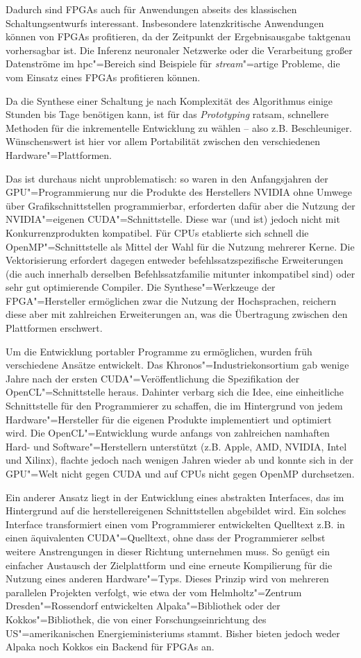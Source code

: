 Dadurch sind FPGAs auch für Anwendungen abseits des klassischen
Schaltungsentwurfs interessant. Insbesondere latenzkritische Anwendungen können
von FPGAs profitieren, da der Zeitpunkt der Ergebnisausgabe taktgenau
vorhersagbar ist. Die Inferenz neuronaler Netzwerke oder die Verarbeitung großer
Datenströme im \gls{hpc}"=Bereich sind Beispiele für \textit{stream}"=artige
Probleme, die vom Einsatz eines FPGAs profitieren können.

Da die Synthese einer Schaltung je nach Komplexität des Algorithmus einige
Stunden bis Tage benötigen kann, ist für das \textit{Prototyping} ratsam,
schnellere Methoden für die inkrementelle Entwicklung zu wählen -- also z.B.
Beschleuniger. Wünschenswert ist hier vor allem Portabilität zwischen den
verschiedenen Hardware"=Plattformen.

Das ist durchaus nicht unproblematisch: so waren in den Anfangsjahren der
GPU"=Programmierung nur die Produkte des Herstellers NVIDIA ohne Umwege über
Grafikschnittstellen programmierbar, erforderten dafür aber die Nutzung der
NVIDIA"=eigenen CUDA"=Schnittstelle. Diese war (und ist) jedoch nicht mit
Konkurrenzprodukten kompatibel. Für CPUs etablierte sich schnell die
OpenMP"=Schnittstelle als Mittel der Wahl für die Nutzung mehrerer Kerne.
Die Vektorisierung erfordert dagegen entweder befehlssatzspezifische
Erweiterungen (die auch innerhalb derselben Befehlssatzfamilie mitunter
inkompatibel sind) oder sehr gut optimierende Compiler. Die Synthese"=Werkzeuge
der FPGA"=Hersteller ermöglichen zwar die Nutzung der Hochsprachen, reichern
diese aber mit zahlreichen Erweiterungen an, was die Übertragung zwischen den
Plattformen erschwert.

Um die Entwicklung portabler Programme zu ermöglichen, wurden früh verschiedene
Ansätze entwickelt. Das Khronos"=Industriekonsortium gab wenige Jahre nach der
ersten CUDA"=Veröffentlichung die Spezifikation der OpenCL"=Schnittstelle
heraus. Dahinter verbarg sich die Idee, eine einheitliche Schnittstelle für den
Programmierer zu schaffen, die im Hintergrund von jedem Hardware"=Hersteller für
die eigenen Produkte implementiert und optimiert wird. Die OpenCL"=Entwicklung
wurde anfangs von zahlreichen namhaften Hard- und Software"=Herstellern
unterstützt (z.B. Apple, AMD, NVIDIA, Intel und Xilinx), flachte jedoch nach
wenigen Jahren wieder ab und konnte sich in der GPU"=Welt nicht gegen CUDA
und auf CPUs nicht gegen OpenMP durchsetzen.

Ein anderer Ansatz liegt in der Entwicklung eines abstrakten Interfaces, das im
Hintergrund auf die herstellereigenen Schnittstellen abgebildet wird. Ein
solches Interface transformiert einen vom Programmierer entwickelten Quelltext
z.B. in einen äquivalenten CUDA"=Quelltext, ohne dass der Programmierer selbst
weitere Anstrengungen in dieser Richtung unternehmen muss. So genügt ein
einfacher Austausch der Zielplattform und eine erneute Kompilierung für die
Nutzung eines anderen Hardware"=Typs. Dieses Prinzip wird von mehreren
parallelen Projekten verfolgt, wie etwa der vom Helmholtz"=Zentrum
Dresden"=Rossendorf entwickelten Alpaka"=Bibliothek oder der Kokkos"=Bibliothek,
die von einer Forschungseinrichtung des US"=amerikanischen Energieministeriums
stammt. Bisher bieten jedoch weder Alpaka noch Kokkos ein Backend für FPGAs an.

